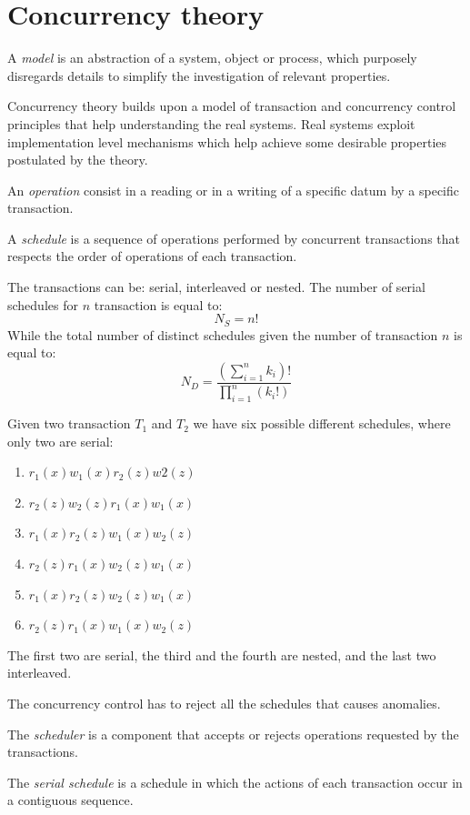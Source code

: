 \documentclass[12pt, a4paper]{report}
\newtheorem[style=M,bodystyle=\normalfont]{theorem}{Theorem}
\newtheorem[style=M,bodystyle=\normalfont]{corollary}{Corollary}
\newtheorem[style=M,bodystyle=\normalfont]{lemma}{Lemma}
\newtheorem[style=M,bodystyle=\normalfont]{definition}{Definition}
\begin{document}
    \section{Concurrency theory}
    \begin{definition}
        A \emph{model} is an abstraction of a system, object or process, which purposely disregards details to simplify the investigation of relevant properties. 
    \end{definition}
    Concurrency theory builds upon a model of transaction and concurrency control principles that help understanding the real systems. Real systems exploit implementation level 
    mechanisms which help achieve some desirable properties postulated by the theory. 
    \begin{definition}
        An \emph{operation} consist in a reading or in a writing of a specific datum by a specific transaction. 

        A \emph{schedule} is a sequence of operations performed by concurrent transactions that respects the order of operations of each transaction. 
    \end{definition}
    The transactions can be: serial, interleaved or nested. The number of serial schedules for $n$ transaction is equal to: 
    \[N_S=n!\]
    While the total number of distinct schedules given the number of transaction $n$ is equal to: 
    \[N_D=\dfrac{\left( \sum_{i=1}^nk_i \right)!}{\prod_{i=1}^n \left( k_i! \right)}\]
    \begin{example}
        Given two transaction $T_1$ and $T_2$ we have six possible different schedules, where only two are serial:
        \begin{enumerate}
            \item $r_1(x) w_1(x) r_2(z) w2(z)$
            \item $r_2(z) w_2(z) r_1(x) w_1(x)$
            \item $r_1(x) r_2(z) w_1(x) w_2(z)$
            \item $r_2(z) r_1(x) w_2(z) w_1(x)$
            \item $r_1(x) r_2(z) w_2(z) w_1(x)$
            \item $r_2(z) r_1(x) w_1(x) w_2(z)$
        \end{enumerate}
        The first two are serial, the third and the fourth are nested, and the last two interleaved.
    \end{example}
    The concurrency control has to reject all the schedules that causes anomalies. 
    \begin{definition}
        The \emph{scheduler} is a component that accepts or rejects operations requested by the transactions. 

        The \emph{serial schedule} is a schedule in which the actions of each transaction occur in a contiguous sequence.
    \end{definition}
\end{document}
